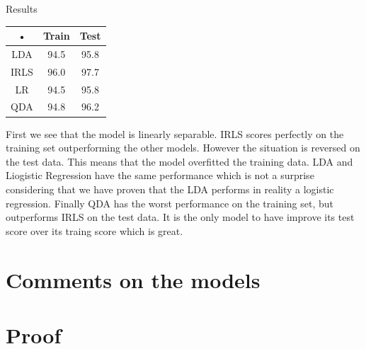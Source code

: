 \documentclass[a4paper]{article}
\begin{document}
\begin{minipage}[c]{0,35\textwidth}
Results\\
\begin{tabular}{|c|c|c|}
\hline 
• & Train & Test \\ 
\hline 
LDA & 94.5 & 95.8 \\ 
\hline 
IRLS & 96.0 & 97.7 \\ 
\hline 
LR & 94.5 & 95.8 \\ 
\hline 
QDA & 94.8 & 96.2 \\ 
\hline 
\end{tabular} 
\end{minipage}
\begin{minipage}{0,6\textwidth}
First we see that the model is linearly separable. IRLS scores perfectly on the training set outperforming the other models. However the situation is reversed on the test data. This means that the model overfitted the training data. LDA and Liogistic Regression have the same performance which is not a surprise considering that we have proven that the LDA performs in reality a logistic regression. Finally QDA has the worst performance on the training set, but outperforms IRLS on the test data. It is the only model to have improve its test score over its traing score which is great.
\end{minipage}
\newpage
\section{Comments on the models}
\newpage
\section{Proof}
\end{document}
